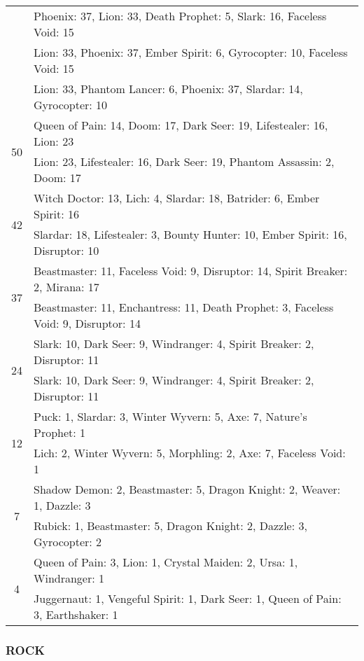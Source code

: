 \begin{table}[H]
\begin{tabular}{ | c | p{12.5cm} | }
& Phoenix: 37, Lion: 33, Death Prophet: 5, Slark: 16, Faceless Void: 15 \\
& Lion: 33, Phoenix: 37, Ember Spirit: 6, Gyrocopter: 10, Faceless Void: 15 \\
& Lion: 33, Phantom Lancer: 6, Phoenix: 37, Slardar: 14, Gyrocopter: 10 \\
\hline
\multirow{2}{*}{50}
& Queen of Pain: 14, Doom: 17, Dark Seer: 19, Lifestealer: 16, Lion: 23 \\
& Lion: 23, Lifestealer: 16, Dark Seer: 19, Phantom Assassin: 2, Doom: 17 \\
\hline
\multirow{2}{*}{42}
& Witch Doctor: 13, Lich: 4, Slardar: 18, Batrider: 6, Ember Spirit: 16 \\
& Slardar: 18, Lifestealer: 3, Bounty Hunter: 10, Ember Spirit: 16, Disruptor: 10 \\
\hline
\multirow{2}{*}{37}
& Beastmaster: 11, Faceless Void: 9, Disruptor: 14, Spirit Breaker: 2, Mirana: 17 \\
& Beastmaster: 11, Enchantress: 11, Death Prophet: 3, Faceless Void: 9, Disruptor: 14 \\
\hline
\multirow{2}{*}{24}
& Slark: 10, Dark Seer: 9, Windranger: 4, Spirit Breaker: 2, Disruptor: 11 \\
& Slark: 10, Dark Seer: 9, Windranger: 4, Spirit Breaker: 2, Disruptor: 11 \\
\hline
\multirow{2}{*}{12}
& Puck: 1, Slardar: 3, Winter Wyvern: 5, Axe: 7, Nature's Prophet: 1 \\
& Lich: 2, Winter Wyvern: 5, Morphling: 2, Axe: 7, Faceless Void: 1 \\
\hline
\multirow{2}{*}{7}
& Shadow Demon: 2, Beastmaster: 5, Dragon Knight: 2, Weaver: 1, Dazzle: 3 \\
& Rubick: 1, Beastmaster: 5, Dragon Knight: 2, Dazzle: 3, Gyrocopter: 2 \\
\hline
\multirow{2}{*}{4}
& Queen of Pain: 3, Lion: 1, Crystal Maiden: 2, Ursa: 1, Windranger: 1 \\
& Juggernaut: 1, Vengeful Spirit: 1, Dark Seer: 1, Queen of Pain: 3, Earthshaker: 1 \\
\hline
    \end{tabular}
    \caption{}
    \label{}
    \end{table}

\subsubsection*{ROCK}

